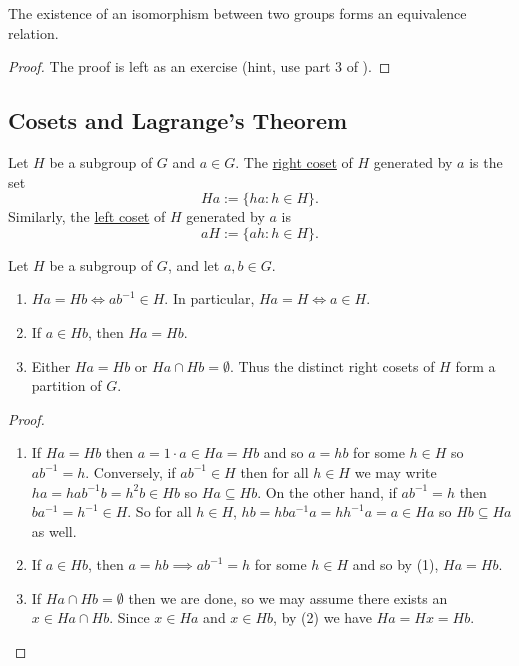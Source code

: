 \documentclass[11pt]{article}
\begin{document}
\begin{corollary}
    The existence of an isomorphism between two groups forms an equivalence relation.
\end{corollary}

\begin{proof}
    The proof is left as an exercise (hint, use part 3 of ).
\end{proof}

\subsection{Cosets and Lagrange's Theorem}

\begin{definition}[Cosets]
    Let $H$ be a subgroup of $G$ and $a\in G$. The \ul{right coset} of $H$ generated by $a$ is the set
    \[Ha:=\{ha:h\in H\}.\]
    Similarly, the \ul{left coset} of $H$ generated by $a$ is
    \[aH:=\{ah:h\in H\}.\]
\end{definition}

\begin{proposition}
    Let $H$ be a subgroup of $G$, and let $a,b\in G$.
    \begin{enumerate}
        \item $Ha=Hb\iff ab^{-1}\in H$. In particular, $Ha=H\iff a\in H$.
        \item If $a\in Hb$, then $Ha=Hb$.
        \item Either $Ha=Hb$ or $Ha\cap Hb=\emptyset$. Thus the distinct right cosets of $H$ form a partition of $G$.
    \end{enumerate}
\end{proposition}

\begin{proof}\,
\begin{enumerate}
    \item If $Ha=Hb$ then $a=1\cdot a\in Ha=Hb$ and so $a=hb$ for some $h\in H$ so $ab^{-1}=h$. Conversely, if $ab^{-1}\in H$ then for all $h\in H$ we may write $ha=hab^{-1}b=h^2b\in Hb$ so $Ha\subseteq Hb$. On the other hand, if $ab^{-1}=h$ then $ba^{-1}=h^{-1}\in H$. So for all $h\in H$, $hb=hba^{-1}a=hh^{-1}a=a\in Ha$ so $Hb\subseteq Ha$ as well.

    \item If $a\in Hb$, then $a=hb\implies ab^{-1}=h$ for some $h\in H$ and so by (1), $Ha=Hb$.

    \item If $Ha\cap Hb=\emptyset$ then we are done, so we may assume there exists an $x\in Ha\cap Hb$. Since $x\in Ha$ and $x\in Hb$, by (2) we have $Ha=Hx=Hb$.
\end{enumerate}
\end{proof}
\end{document}
